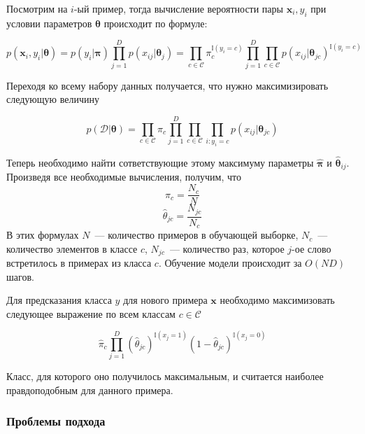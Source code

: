 Посмотрим на $i$-ый пример, тогда вычисление вероятности пары $\mathbf{x}_i, y_i$ при условии
параметров $\mathbf{\theta}$ происходит по формуле:

\begin{equation}
  p(\mathbf{x}_i, y_i|\mathbf{\theta})
  = p(y_i|\mathbf{\pi})\prod_{j=1}^Dp(x_{ij}|\mathbf{\theta}_j)
  = \prod_{c\in\mathcal{C}}\pi_c^{\mathbb{I}(y_i=c)}
    \prod_{j=1}^D\prod_{c\in\mathcal{C}}p(x_{ij}|\mathbf{\theta}_{jc})^{\mathbb{I}(y_i=c)}
  \label{eq:mle}
\end{equation}

Переходя ко всему набору данных получается, что нужно максимизировать следующую величину

\begin{equation}
  p(\mathcal{D}|\mathbf{\theta})
  = \prod_{c\in\mathcal{C}}\pi_c
    \prod_{j=1}^D\prod_{c\in\mathcal{C}}\prod_{i:y_i=c}p(x_{ij}|\mathbf{\theta}_{jc})
  \label{eq:mleD}
\end{equation}

Теперь необходимо найти сответствующие этому максимуму параметры $\hat{\mathbf{\pi}}$
и $\hat{\mathbf{\theta}}_{ij}$. Произведя
все необходимые вычисления, получим, что
\begin{equation}
  \hat{\pi}_c = \frac{N_c}{N}
  \label{eq:pinb}
\end{equation}
\begin{equation}
  \hat{\theta}_{jc}= \frac{N_{jc}}{N_c}
  \label{eq:thetanb}
\end{equation}
В этих формулах $N$~--- количество примеров в обучающей выборке, $N_c$~---количество элементов в
классе $c$,
$N_{jc}$~--- количество раз, которое $j$-ое слово встретилось в примерах из класса $c$. Обучение
модели происходит за $O(ND)$ шагов.

Для предсказания класса $y$ для нового примера $\mathbf{x}$ необходимо максимизовать следующее
выражение по всем классам $c \in \mathcal{C}$

\begin{equation}
  \hat{\pi}_c\prod_{j=1}^D(\hat{\theta}_{jc})^{\mathbb{I}(x_j=1)}(1-\hat{\theta}_{jc})^{\mathbb{I}(x_j=0)}
  \label{eq:predict}
\end{equation}

Класс, для которого оно получилось максимальным, и считается наиболее правдоподобным для данного
примера.

\subsubsection{Проблемы подхода}


